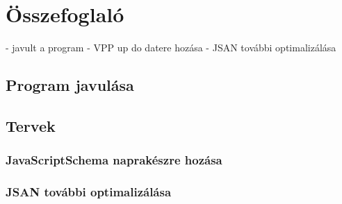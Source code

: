 \chapter*{Összefoglaló}
- javult a program
- VPP up do datere hozása
- JSAN további optimalizálása

\section{Program javulása}

\section{Tervek}

\subsection{JavaScriptSchema naprakészre hozása}

\subsection{JSAN további optimalizálása}


